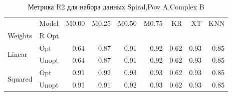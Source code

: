 \begin{table}
\caption{Метрика R2 для набора данных Spiral,Pow A,Complex B}
\label{tab:R2_Spiral,Pow A,Complex B}
\begin{tabular}{llrrrrrrr}
\toprule
 & Model & M0.00 & M0.25 & M0.50 & M0.75 & KR & XT & KNN \\
Weights & R Opt &  &  &  &  &  &  &  \\
\midrule
\multirow[t]{2}{*}{Linear} & Opt & 0.64 & 0.87 & 0.91 & 0.92 & 0.62 & 0.93 & 0.85 \\
 & Unopt & 0.64 & 0.87 & 0.91 & 0.92 & 0.62 & 0.93 & 0.85 \\

\multirow[t]{2}{*}{Squared} & Opt & 0.91 & 0.92 & 0.93 & 0.93 & 0.62 & 0.93 & 0.85 \\
 & Unopt & 0.91 & 0.91 & 0.92 & 0.93 & 0.62 & 0.93 & 0.85 \\

\bottomrule
\end{tabular}
\end{table}

